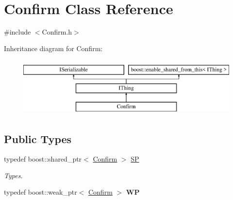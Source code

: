 \hypertarget{class_confirm}{}\section{Confirm Class Reference}
\label{class_confirm}


{\ttfamily \#include $<$Confirm.\+h$>$}

Inheritance diagram for Confirm\+:\begin{figure}[H]
\begin{center}
\leavevmode
\includegraphics[height=3.000000cm]{class_confirm}
\end{center}
\end{figure}
\subsection*{Public Types}
\begin{DoxyCompactItemize}
\item 
\mbox{\label{class_confirm_ae9623ec7393449c3dd1a867282bf934a}} 
typedef boost\+::shared\+\_\+ptr$<$ \hyperlink{class_confirm}{Confirm} $>$ \hyperlink{class_confirm_ae9623ec7393449c3dd1a867282bf934a}{SP}
\begin{DoxyCompactList}\small\item\em Types. \end{DoxyCompactList}\item 
\mbox{\label{class_confirm_abca7c131a80885546d07b112754c4703}} 
typedef boost\+::weak\+\_\+ptr$<$ \hyperlink{class_confirm}{Confirm} $>$ {\bfseries WP}
\end{DoxyCompactItemize}
